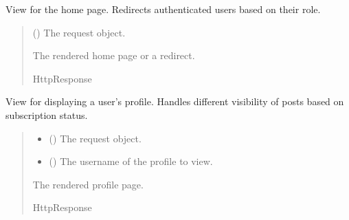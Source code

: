 \documentclass[letterpaper,10pt,english]{sphinxmanual}
\begin{document}

\begin{fulllineitems}
\label{\detokenize{modules/views:account.views.home}}
\pysigstartsignatures
{}
\pysigstopsignatures
\sphinxAtStartPar
View for the home page. Redirects authenticated users based on their role.
\begin{quote}\begin{description}
\sphinxAtStartPar
{} () \textendash{} The request object.

\sphinxAtStartPar
The rendered home page or a redirect.

\sphinxAtStartPar
HttpResponse

\end{description}\end{quote}

\end{fulllineitems}


\begin{fulllineitems}
\label{\detokenize{modules/views:account.views.profile}}
\pysigstartsignatures
{}
\pysigstopsignatures
\sphinxAtStartPar
View for displaying a user’s profile. Handles different visibility of posts based on subscription status.
\begin{quote}\begin{description}
\begin{itemize}
\item {} 
\sphinxAtStartPar
{} () \textendash{} The request object.

\item {} 
\sphinxAtStartPar
{} () \textendash{} The username of the profile to view.

\end{itemize}

\sphinxAtStartPar
The rendered profile page.

\sphinxAtStartPar
HttpResponse

\end{description}\end{quote}

\end{fulllineitems}
\end{document}
